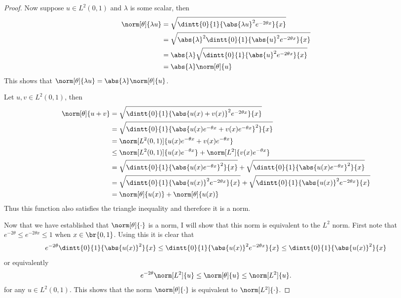 \documentclass[11pt, oneside]{article}
\begin{document}
\begin{enumerate}
\begin{proof}
      Now suppose $u \in L^2(0, 1)$ and $\lambda$ is some scalar, then
      \begin{align*}
        \norm[\theta]{\lambda u} &= \sqrt{\dintt{0}{1}{\abs{\lambda u}^2e^{-2\theta x}}{x}} \\
        &= \sqrt{\abs{\lambda}^2 \dintt{0}{1}{\abs{u}^2e^{-2\theta x}}{x}} \\
        &= \abs{\lambda} \sqrt{\dintt{0}{1}{\abs{u}^2e^{-2\theta x}}{x}} \\
        &= \abs{\lambda} \norm[\theta]{u}
      \end{align*}
      This shows that $\norm[\theta]{\lambda u} = \abs{\lambda} \norm[\theta]{u}$.

      Let $u, v \in L^2(0, 1)$, then
      \begin{align*}
        \norm[\theta]{u + v} &= \sqrt{\dintt{0}{1}{\abs{u(x) + v(x)}^2e^{-2\theta x}}{x}} \\
        &= \sqrt{\dintt{0}{1}{\abs{u(x)e^{-\theta x} + v(x)e^{-\theta x}}^2}{x}} \\
        &= \norm[L^2(0, 1)]{u(x)e^{-\theta x} + v(x)e^{-\theta x}} \\
        &\le \norm[L^2(0, 1)]{u(x)e^{-\theta x}} + \norm[L^2]{v(x)e^{-\theta x}} \\
        &= \sqrt{\dintt{0}{1}{\abs{u(x)e^{-\theta x}}^2}{x}} + \sqrt{\dintt{0}{1}{\abs{u(x)e^{-\theta x}}^2}{x}} \\
        &= \sqrt{\dintt{0}{1}{\abs{u(x)}^2e^{-2\theta x}}{x}} + \sqrt{\dintt{0}{1}{\abs{u(x)}^2e^{-2\theta x}}{x}} \\
        &= \norm[\theta]{u(x)} + \norm[\theta]{u(x)}
      \end{align*}
      Thus this function also satisfies the triangle inequality and therefore
      it is a norm.

      Now that we have established that $\norm[\theta]{\cdot}$ is a norm, I will
      show that this norm is equivalent to the $L^2$ norm.
      First note that $e^{-2\theta} \le e^{-2\theta x} \le 1$ when
      $x \in \br{0, 1}$.
      Using this it is clear that
      \[
        e^{-2\theta} \dintt{0}{1}{\abs{u(x)}^2}{x} \le \dintt{0}{1}{\abs{u(x)}^2 e^{-2\theta x}}{x} \le \dintt{0}{1}{\abs{u(x)}^2}{x}
      \]
      or equivalently
      \[
        e^{-2\theta} \norm[L^2]{u} \le \norm[\theta]{u} \le \norm[L^2]{u}.
      \]
      for any $u \in L^2(0, 1)$.
      This shows that the norm $\norm[\theta]{\cdot}$ is equivalent to
      $\norm[L^2]{\cdot}$.
    \end{proof}


\end{enumerate}
\end{document}
